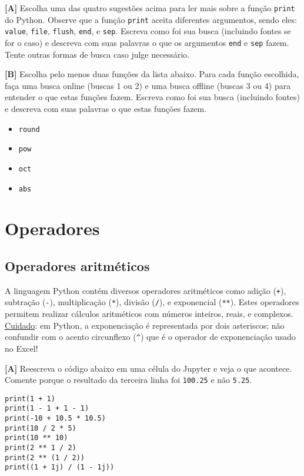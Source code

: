 \documentclass[11pt]{article}
\begin{document}
\textbf{[A]} Escolha uma das quatro sugestões acima para ler mais sobre a função \texttt{print} do Python. Observe que a função \texttt{print} aceita diferentes argumentos, sendo eles: \texttt{value}, \texttt{file}, \texttt{flush}, \texttt{end}, e \texttt{sep}. Escreva como foi sua busca (incluindo fontes se for o caso) e descreva com suas palavras o que os argumentos \texttt{end} e \texttt{sep} fazem. Tente outras formas de busca caso julge necessário.

\textbf{[B]} Escolha pelo menos duas funções da lista abaixo. Para cada função escolhida, faça uma busca online (buscas 1 ou 2) e uma busca offline (buscas 3 ou 4) para entender o que estas funções fazem. Escreva como foi sua busca (incluindo fontes) e descreva com suas palavras o que estas funções fazem.

\begin{itemize}
\item \texttt{round}
\item \texttt{pow}
\item \texttt{oct}
\item \texttt{abs}
\end{itemize}

\section{Operadores}
\label{sec:orgede73dd}
\subsection{Operadores aritméticos}
\label{sec:orgd105ed3}

A linguagem Python contém diversos operadores aritméticos como adição (\texttt{+}), subtração (\texttt{-}), multiplicação (\texttt{*}), divisão (\texttt{/}), e exponencial (\texttt{**}). Estes operadores permitem realizar cálculos aritméticos com números inteiros, reais, e complexos. \uline{Cuidado}: em Python, a exponenciação é representada por dois asteriscos; não confundir com o acento circunflexo (\texttt{\textasciicircum{}}) que é o operador de exponenciação usado no Excel!

\textbf{[A]} Reescreva o código abaixo em uma célula do Jupyter e veja o que acontece. Comente porque o resultado da terceira linha foi \texttt{100.25} e não \texttt{5.25}.

\begin{verbatim}
print(1 + 1)
print(1 - 1 + 1 - 1)
print(-10 + 10.5 * 10.5)
print(10 / 2 * 5)
print(10 ** 10)
print(2 ** 1 / 2)
print(2 ** (1 / 2))
print((1 + 1j) / (1 - 1j))
\end{verbatim}
\end{document}

